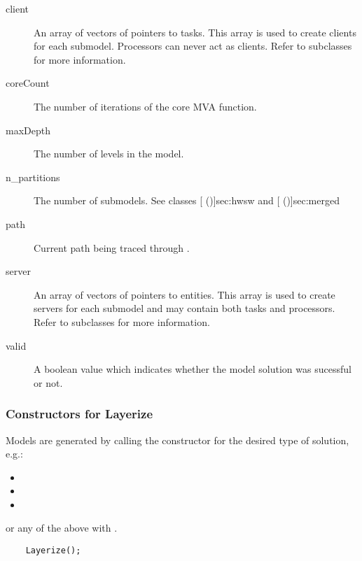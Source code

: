 \begin{description}
\item[client] \texonly{---} An array of vectors of pointers to
  tasks.  This array is used to create clients for each submodel.
  Processors can never act as clients.  Refer to subclasses for more
  information. 
\item[coreCount] \texonly{---} The number of iterations of the core
  MVA  function.
\item[maxDepth] \texonly{---} The number of levels in the model.
\item[n\_partitions] \texonly{---} The number of submodels.  See
  classes [ (\Sec\Ref)]{sec:hwsw} and
  [ (\Sec\Ref)]{sec:merged}
\item[path] \texonly{---} Current path being traced through
  . \\
\item[server] \texonly{---} An array of vectors of pointers to
  entities.  This array is used to create servers for each submodel
  and may contain both tasks and processors.  Refer to subclasses for
  more information.
\item[valid] \texonly{---} A boolean value which indicates whether the
  model solution was sucessful or not.
\end{description}

\subsubsection{Constructors for Layerize}
\label{sec:layerize-constructors}

Models are generated by calling the constructor for the desired type
of solution, e.g.:
\begin{itemize}
\item {} 
\item {} 
\item {} 
\end{itemize}
or any of the above with .  

\begin{verbatim}
    Layerize();
\end{verbatim}

